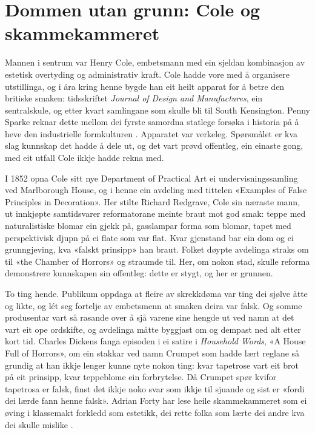 \section{Dommen utan grunn: Cole og skammekammeret}

Mannen i sentrum var Henry Cole, embetsmann med ein sjeldan kombinasjon av estetisk overtyding og administrativ kraft. Cole hadde vore med å organisere utstillinga, og i åra kring henne bygde han eit heilt apparat for å betre den britiske smaken: tidsskriftet \textit{Journal of Design and Manufactures}, ein sentralskule, og etter kvart samlingane som skulle bli til South Kensington. Penny Sparke reknar dette mellom dei fyrste samordna statlege forsøka i historia på å heve den industrielle formkulturen \autocite{sparke2004}. Apparatet var verkeleg. Spørsmålet er kva slag kunnskap det hadde å dele ut, og det vart prøvd offentleg, ein einaste gong, med eit utfall Cole ikkje hadde rekna med.

I 1852 opna Cole sitt nye Department of Practical Art ei undervisningssamling ved Marlborough House, og i henne ein avdeling med tittelen «Examples of False Principles in Decoration». Her stilte Richard Redgrave, Cole sin næraste mann, ut innkjøpte samtidsvarer reformatorane meinte braut mot god smak: teppe med naturalistiske blomar ein gjekk på, gasslampar forma som blomar, tapet med perspektivisk djupn på ei flate som var flat. Kvar gjenstand bar ein dom og ei grunngjeving, kva «falskt prinsipp» han braut. Folket døypte avdelinga straks om til «the Chamber of Horrors» og straumde til. Her, om nokon stad, skulle reforma demonstrere kunnskapen sin offentleg: dette er stygt, og her er grunnen.

To ting hende. Publikum oppdaga at fleire av skrekkdøma var ting dei sjølve åtte og likte, og lét seg fortelje av embetsmenn at smaken deira var falsk. Og somme produsentar vart så rasande over å sjå varene sine hengde ut ved namn at det vart eit ope ordskifte, og avdelinga måtte byggjast om og dempast ned alt etter kort tid. Charles Dickens fanga episoden i ei satire i \textit{Household Words}, «A House Full of Horrors», om ein stakkar ved namn Crumpet som hadde lært reglane så grundig at han ikkje lenger kunne nyte nokon ting: kvar tapetrose vart eit brot på eit prinsipp, kvar teppeblome ein forbrytelse. Då Crumpet spør kvifor tapetrosa er falsk, finst det ikkje noko svar som ikkje til sjuande og sist er «fordi dei lærde fann henne falsk». Adrian Forty har lese heile skammekammeret som ei øving i klassemakt forkledd som estetikk, dei rette folka som lærte dei andre kva dei skulle mislike \autocite{forty1986}.

